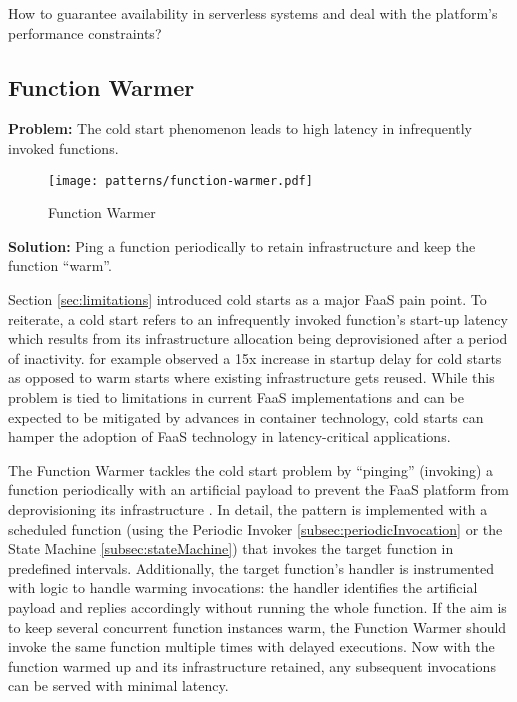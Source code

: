 How to guarantee availability in serverless systems and deal with the platform's performance constraints?

\subsection{Function Warmer} \label{subsec:FunctionWarmer}

\textbf{Problem:} The cold start phenomenon leads to high latency in infrequently invoked functions.

\begin{figure}[h]
  \centering
  \texttt{[image: patterns/function-warmer.pdf]}
  \caption{Function Warmer}
  \label{fig:functionWarmer}
\end{figure}

\textbf{Solution:} Ping a function periodically to retain infrastructure and keep the function ``warm''.

Section \ref{sec:limitations} introduced cold starts as a major FaaS pain point. To reiterate, a cold start refers to an infrequently invoked function's start-up latency which results from its infrastructure allocation being deprovisioned after a period of inactivity. \textcite{lloydserverless} for example observed a 15x increase in startup delay for cold starts as opposed to warm starts where existing infrastructure gets reused. While this problem is tied to limitations in current FaaS implementations and can be expected to be mitigated by advances in container technology, cold starts can hamper the adoption of FaaS technology in latency-critical applications.

The Function Warmer tackles the cold start problem by ``pinging'' (invoking) a function periodically with an artificial payload to prevent the FaaS platform from deprovisioning its infrastructure \parencite{leitner18industrialpractice}. In detail, the pattern is implemented with a scheduled function (using the Periodic Invoker \ref{subsec:periodicInvocation} or the State Machine \ref{subsec:stateMachine}) that invokes the target function in predefined intervals. Additionally, the target function's handler is instrumented with logic to handle warming invocations: the handler identifies the artificial payload and replies accordingly without running the whole function. If the aim is to keep several concurrent function instances warm, the Function Warmer should invoke the same function multiple times with delayed executions. Now with the function warmed up and its infrastructure retained, any subsequent invocations can be served with minimal latency.

